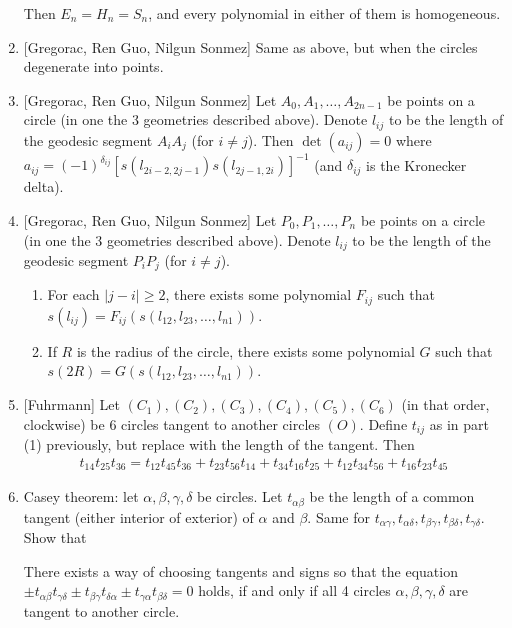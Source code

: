\documentclass{treatise}
\begin{document}
\begin{shaded}
\begin{theorem}
\begin{enumerate}
\begin{enumerate}
	\end{enumerate}
	Then $E_n = H_n = S_n$, and every polynomial in either of them is homogeneous.
	\item {[Gregorac, Ren Guo, Nilgun Sonmez]} Same as above, but when the circles degenerate into points.
	\item {[Gregorac, Ren Guo, Nilgun Sonmez]} Let $A_0, A_1, \hdots, A_{2n - 1}$ be points on a circle (in one the 3 geometries described above). Denote $l_{ij}$ to be the length of the geodesic segment $A_i A_j$ (for $i \neq j$). Then $\det (a_{ij}) = 0$ where $a_{ij} = (-1)^{\delta_{ij}} [s(l_{2i - 2, 2j - 1}) s(l_{2j - 1, 2i})]^{-1}$ (and $\delta_{ij}$ is the Kronecker delta).
	\item {[Gregorac, Ren Guo, Nilgun Sonmez]} Let $P_0, P_1, \hdots, P_n$ be points on a circle (in one the 3 geometries described above). Denote $l_{ij}$ to be the length of the geodesic segment $P_i P_j$ (for $i \neq j$).
	\begin{enumerate}
		\item For each $|j - i| \geq 2$, there exists some polynomial $F_{ij}$ such that $s(l_{ij}) = F_{ij}(s(l_{12}, l_{23}, \hdots, l_{n1}))$.
		\item If $R$ is the radius of the circle, there exists some polynomial $G$ such that $s(2R) = G(s(l_{12}, l_{23}, \hdots, l_{n1}))$.
	\end{enumerate}
	\item {[Fuhrmann]} Let $(C_1), (C_2), (C_3), (C_4), (C_5), (C_6)$ (in that order, clockwise) be 6 circles tangent to another circles $(O)$. Define $t_{ij}$ as in part (1) previously, but replace with the length of the tangent. Then
	\begin{align*}
	t_{14} t_{25} t_{36} = t_{12} t_{45} t_{36} + t_{23} t_{56} t_{14} + t_{34} t_{16} t_{25} + t_{12} t_{34} t_{56} + t_{16} t_{23} t_{45}
	\end{align*}
	\item Casey theorem: let $\alpha, \beta, \gamma, \delta$ be circles. Let $t_{\alpha \beta}$ be the length of a common tangent (either interior of exterior) of $\alpha$ and $\beta$. Same for $t_{\alpha \gamma}, t_{\alpha \delta}, t_{\beta \gamma}, t_{\beta \delta}, t_{\gamma \delta}$. Show that
	\begin{center}
	There exists a way of choosing tangents and signs so that the equation $\pm t_{\alpha \beta} t_{\gamma \delta} \pm t_{\beta \gamma} t_{\delta \alpha} \pm t_{\gamma \alpha} t_{\beta \delta} = 0$ holds, if and only if all 4 circles $\alpha, \beta, \gamma, \delta$ are tangent to another circle.

\end{center}
\end{enumerate}
\end{theorem}
\end{shaded}
\end{document}

